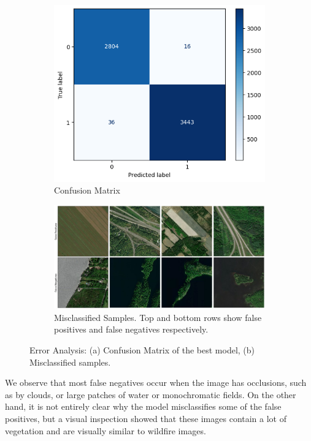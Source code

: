 \documentclass{article}
\begin{document}
\begin{figure}[!t]
  \centering
  \begin{subfigure}{0.325\textwidth}
    \centering
    \includegraphics[width=\textwidth]{figures/confusion.png}
    \caption{Confusion Matrix}
  \end{subfigure}%
  \hfill
  \begin{subfigure}{0.65\textwidth}
    \centering
    \includegraphics[width=\textwidth]{figures/errors3.png}
    \caption{Misclassified Samples. Top and bottom rows show false positives and false negatives respectively.}
  \end{subfigure}
  \caption{Error Analysis: (a) Confusion Matrix of the best model, (b) Misclassified samples.}
  \label{fig:error_analysis}
\end{figure}

We observe that most false negatives occur when the image has occlusions, such
as by clouds, or large patches of water or monochromatic fields. On the other
hand, it is not entirely clear why the model misclassifies some of the false
positives, but a visual inspection showed that these images contain a lot of
vegetation and are visually similar to wildfire images.
\end{document}
